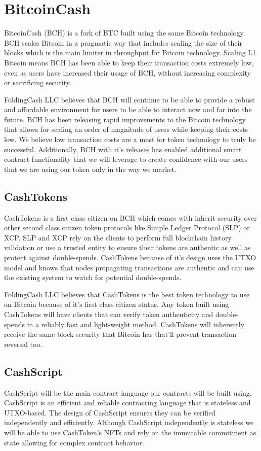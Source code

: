 \documentclass[letterpaper,12pt,titlepage]{article}
\def\org{FoldingCash LLC}
\begin{document}
\section{BitcoinCash}
BitcoinCash (BCH) is a fork of BTC built using the same Bitcoin technology. BCH scales Bitcoin in a pragmatic way that includes scaling the size of their blocks which is the main limiter in throughput for Bitcoin technology. Scaling L1 Bitcoin means BCH has been able to keep their transaction costs extremely low, even as users have increased their usage of BCH, without increasing complexity or sacrificing security.

\org{} believes that BCH will continue to be able to provide a robust and affordable environment for users to be able to interact now and far into the future. BCH has been releasing rapid improvements to the Bitcoin technology that allows for scaling an order of magnitude of users while keeping their costs low. We believe low transaction costs are a must for token technology to truly be successful. Additionally, BCH with it's releases has enabled additional smart contract functionality that we will leverage to create confidence with our users that we are using our token only in the way we market.

\subsection{CashTokens}
CashTokens is a first class citizen on BCH which comes with inherit security over other second class citizen token protocols like Simple Ledger Protocol (SLP) or XCP. SLP and XCP rely on the clients to perform full blockchain history validation or use a trusted entity to ensure their tokens are authentic as well as protect against double-spends. CashTokens because of it's design uses the UTXO model and knows that nodes propagating transactions are authentic and can use the existing system to watch for potential double-spends.

\org{} believes that CashTokens is the best token technology to use on Bitcoin because of it's first class citizen status. Any token built using CashTokens will have clients that can verify token authenticity and double-spends in a reliably fast and light-weight method. CashTokens will inherently receive the same block security that Bitcoin has that'll prevent transaction reversal too.

\subsection{CashScript}
CashScript will be the main contract language our contracts will be built using. CashScript is an efficient and reliable contracting language that is stateless and UTXO-based. The design of CashScript ensures they can be verified independently and efficiently. Although CashScript independently is stateless we will be able to use CashToken's NFTs and rely on the immutable commitment as state allowing for complex contract behavior.
\end{document}
